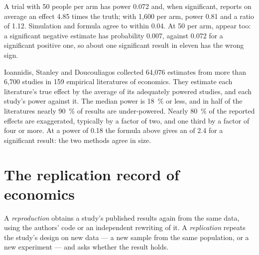 \label{lst:b3:credible-empirical-work:filter}

\label{out:b3:credible-empirical-work:filter}

A trial with 50 people per arm has power 0.072 and, when significant, reports on
average an effect 4.85 times the truth; with 1{,}600 per arm, power 0.81 and a
ratio of 1.12. %
Simulation and formula agree to within 0.04. At 50 per arm,  appear
too: a significant negative estimate has probability 0.007, against 0.072 for a
significant positive one, so about one significant result in eleven has the wrong
sign.

\begin{measure}
Ioannidis, Stanley and Doucouliagos collected 64{,}076 estimates from more than
6{,}700 studies in 159 empirical literatures of economics. They estimate each
literature's true effect by the average of its adequately powered studies, and
each study's power against it. The median power is 18~\% or less, and in half of
the literatures nearly 90~\% of results are under-powered. Nearly 80~\% of the
reported effects are exaggerated, typically by a factor of two, and one third by
a factor of four or more. %
At a power of 0.18 the formula above gives an  of 2.4 for a
significant result: the two methods agree in size.
\end{measure}

\section{The replication record of economics}\label{sec:b3:credible-empirical-work:replication}

\begin{definition}\label{def:b3:credible-empirical-work:replication}
A \emph{reproduction} obtains a study's published results again from the same
data, using the authors' code or an independent rewriting of it. A
\emph{replication} repeats the study's design on new data --- a new sample from
the same population, or a new experiment --- and asks whether the result holds.
\end{definition}

